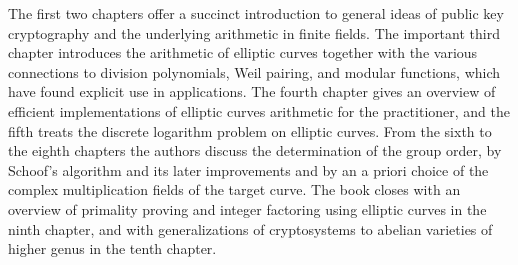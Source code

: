 \documentclass[final]{mcom-l}
\begin{document}
The first two chapters offer a succinct introduction to general ideas of public
key cryptography and the underlying arithmetic in finite fields.  The
important third chapter introduces the arithmetic of elliptic curves together
with the various connections to division polynomials, Weil pairing, and modular
functions, which have found explicit use in applications.  The fourth chapter
gives an overview of efficient implementations of elliptic curves arithmetic
for the practitioner, and the fifth treats the discrete logarithm problem on
elliptic curves.  From the sixth to the eighth chapters the authors discuss the
determination of the group order, by Schoof's algorithm and its later
improvements and by an a priori choice of the complex multiplication fields of
the target curve.  The book closes with an overview of primality proving and
integer factoring using elliptic curves in the ninth chapter, and with
generalizations of cryptosystems to abelian varieties of higher genus in the
tenth chapter.
\end{document}
